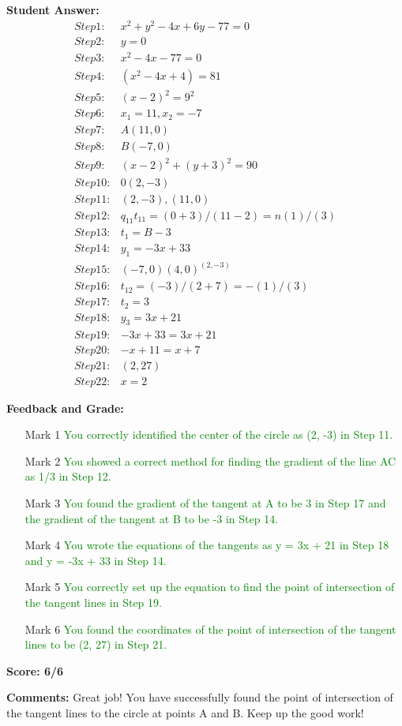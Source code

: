 \documentclass{article}
\begin{document}
\textbf{Student Answer:}
\begin{align*}
Step 1: & x^{2}+y^{2}-4x+6y-77=0 \\
Step 2: & y=0 \\
Step 3: & x^{2}-4x-77=0 \\
Step 4: & (x^{2}-4x+4)=81 \\
Step 5: & (x-2)^{2}=9^{2} \\
Step 6: & x_1=11, x_2=-7 \\
Step 7: & A(11, 0) \\
Step 8: & B(-7, 0) \\
Step 9: & (x-2)^{2}+(y+3)^{2}=90 \\
Step 10: & 0(2,-3) \\
Step 11: & (2,-3),(11,0) \\
Step 12: & q_{11}t_{11}=(0+3)/(11-2)=n(1)/(3) \\
Step 13: & t_1=B-3 \\
Step 14: & y_1=-3x+33 \\
Step 15: & (-7,0)(4,0)^{(2,-3)} \\
Step 16: & t_{12}= (-3)/(2+7)=-(1)/(3) \\
Step 17: & t_2=3 \\
Step 18: & y_3=3x+21 \\
Step 19: & -3x+33=3x+21 \\
Step 20: & -x+11=x+7 \\
Step 21: & (2, 27) \\
Step 22: & x=2
\end{align*}

\textbf{Feedback and Grade:}
\begin{itemize}
\item[Mark 1] \textcolor{green}{You correctly identified the center of the circle as (2, -3) in Step 11.}
\item[Mark 2] \textcolor{green}{You showed a correct method for finding the gradient of the line AC as 1/3 in Step 12.}
\item[Mark 3] \textcolor{green}{You found the gradient of the tangent at A to be 3 in Step 17 and the gradient of the tangent at B to be -3 in Step 14.}
\item[Mark 4] \textcolor{green}{You wrote the equations of the tangents as y = 3x + 21 in Step 18 and y = -3x + 33 in Step 14.}
\item[Mark 5] \textcolor{green}{You correctly set up the equation to find the point of intersection of the tangent lines in Step 19.}
\item[Mark 6] \textcolor{green}{You found the coordinates of the point of intersection of the tangent lines to be (2, 27) in Step 21.}
\end{itemize}

\textbf{Score: 6/6}

\textbf{Comments:} Great job! You have successfully found the point of intersection of the tangent lines to the circle at points A and B. Keep up the good work!
\end{document}
